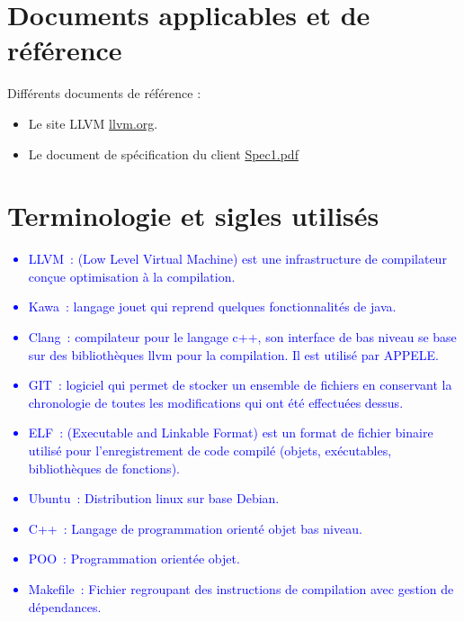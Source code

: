 \documentclass{../res/univ-projet}
\begin{document}
\section{Documents applicables et de référence}
Différents documents de référence :
\begin{itemize}

\item Le site LLVM \href{http://llvm.org}{llvm.org}.
\item Le document de spécification du client \href{file:../client/spec1.pdf}{Spec1.pdf}
\end{itemize}

\section{Terminologie et sigles utilisés}
\textcolor{blue}{
  \begin{itemize}
  	\item LLVM : (Low Level Virtual Machine) est une infrastructure de compilateur conçue optimisation à la compilation.
	\item Kawa : langage jouet qui reprend quelques fonctionnalités de java.
	\item Clang : compilateur pour le langage c++, son interface de bas niveau  se base sur des bibliothèques llvm pour la compilation. Il est utilisé par APPELE.
	\item GIT : logiciel qui permet de stocker un ensemble de fichiers en conservant la chronologie de toutes les modifications qui ont été effectuées dessus.
	\item ELF : (Executable and Linkable Format) est un format de fichier binaire utilisé pour l'enregistrement de code compilé (objets, exécutables, bibliothèques de fonctions).
	\item Ubuntu : Distribution linux sur base Debian.
	\item C++ : Langage de programmation orienté objet bas niveau.
	\item POO : Programmation orientée objet.
	\item Makefile : Fichier regroupant des instructions de compilation avec gestion de dépendances.
  \end{itemize}
}
\end{document}
